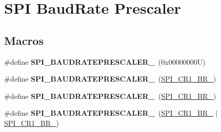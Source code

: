 \hypertarget{group___s_p_i___baud_rate___prescaler}{}\section{S\+PI Baud\+Rate Prescaler}
\label{group___s_p_i___baud_rate___prescaler}
\subsection*{Macros}
\begin{DoxyCompactItemize}
\item 
\mbox{\label{group___s_p_i___baud_rate___prescaler_ga3c1e615518e705b8120f164ff4c1968e}} 
\#define {\bfseries S\+P\+I\+\_\+\+B\+A\+U\+D\+R\+A\+T\+E\+P\+R\+E\+S\+C\+A\+L\+E\+R\+\_}~(0x00000000\+U)
\item 
\mbox{\label{group___s_p_i___baud_rate___prescaler_ga807568c52b5ba449d7a2b1b85549db24}} 
\#define {\bfseries S\+P\+I\+\_\+\+B\+A\+U\+D\+R\+A\+T\+E\+P\+R\+E\+S\+C\+A\+L\+E\+R\+\_}~(\mbox{\hyperlink{group___peripheral___registers___bits___definition_gaa364b123cf797044094cc229330ce321}{S\+P\+I\+\_\+\+C\+R1\+\_\+\+B\+R\+\_}})
\item 
\mbox{\label{group___s_p_i___baud_rate___prescaler_ga2393359eb495f95163206e17194f4847}} 
\#define {\bfseries S\+P\+I\+\_\+\+B\+A\+U\+D\+R\+A\+T\+E\+P\+R\+E\+S\+C\+A\+L\+E\+R\+\_}~(\mbox{\hyperlink{group___peripheral___registers___bits___definition_ga45e93d18c8966964ed1926d5ca87ef46}{S\+P\+I\+\_\+\+C\+R1\+\_\+\+B\+R\+\_}})
\item 
\mbox{\label{group___s_p_i___baud_rate___prescaler_gad6a08d920ad4ee524cf55cd09e4c4d0e}} 
\#define {\bfseries S\+P\+I\+\_\+\+B\+A\+U\+D\+R\+A\+T\+E\+P\+R\+E\+S\+C\+A\+L\+E\+R\+\_}~(\mbox{\hyperlink{group___peripheral___registers___bits___definition_ga45e93d18c8966964ed1926d5ca87ef46}{S\+P\+I\+\_\+\+C\+R1\+\_\+\+B\+R\+\_}} $\vert$ \mbox{\hyperlink{group___peripheral___registers___bits___definition_gaa364b123cf797044094cc229330ce321}{S\+P\+I\+\_\+\+C\+R1\+\_\+\+B\+R\+\_}})
\item 
\mbox{\label{group___s_p_i___baud_rate___prescaler_ga53fda39d29f04b815f525b7f8c8dd9c2}} 

\end{DoxyCompactItemize}
